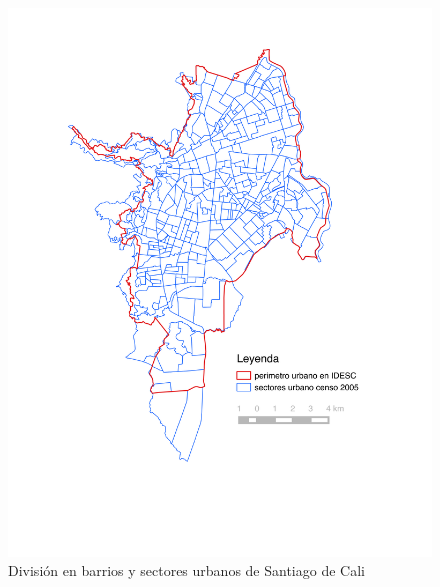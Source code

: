 \documentclass[12pt,]{book}
\begin{document}
\begin{figure}
\includegraphics[width=1\linewidth]{images/sectoresurbanos_perimetro_idesc} \caption{División en barrios y sectores urbanos de Santiago de Cali}\label{fig:su-periurbano}
\end{figure}
\end{document}
